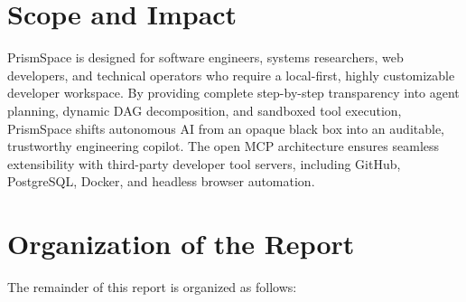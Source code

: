 \documentclass[12pt,a4paper]{report}
\begin{document}
\section{Scope and Impact}
PrismSpace is designed for software engineers, systems researchers, web developers, and technical operators who require a local-first, highly customizable developer workspace. By providing complete step-by-step transparency into agent planning, dynamic DAG decomposition, and sandboxed tool execution, PrismSpace shifts autonomous AI from an opaque black box into an auditable, trustworthy engineering copilot. The open MCP architecture ensures seamless extensibility with third-party developer tool servers, including GitHub, PostgreSQL, Docker, and headless browser automation.

\section{Organization of the Report}
The remainder of this report is organized as follows:
\end{document}
